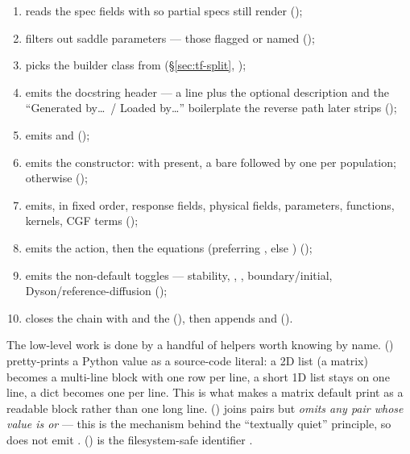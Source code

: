 \begin{enumerate}
  \item reads the spec fields with  so partial specs
        still render ();
  \item filters out saddle parameters --- those flagged  or named
         ();
  \item picks the builder class from  (\S\ref{sec:tf-split},
        );
  \item emits the docstring header --- a  line plus the optional description and the ``Generated by\dots\ /
        Loaded by\dots'' boilerplate the reverse path later strips
        ();
  \item emits  and
         ();
  \item emits the constructor: with  present, a bare
         followed by one  per
        population; otherwise 
        ();
  \item emits, in fixed order, response fields, physical fields, parameters,
        functions, kernels, CGF terms ();
  \item emits the action, then the equations (preferring ,
        else ) ();
  \item emits the non-default toggles --- stability, ,
        , boundary/initial, Dyson/reference-diffusion
        ();
  \item closes the chain with  and the \code{)}
        (), then appends 
        and  ().
\end{enumerate}

The low-level work is done by a handful of helpers worth knowing by name.
 () pretty-prints a Python value as a
source-code literal: a 2D list (a matrix) becomes a multi-line block with one row
per line, a short 1D list stays on one line, a dict becomes one
 per line. This is what makes a matrix default print as a
readable block rather than one long line. 
() joins  pairs but \emph{omits any pair whose value
is  or } --- this is the mechanism behind the ``textually
quiet'' principle, so  does not emit
.  () is the
filesystem-safe identifier
.

